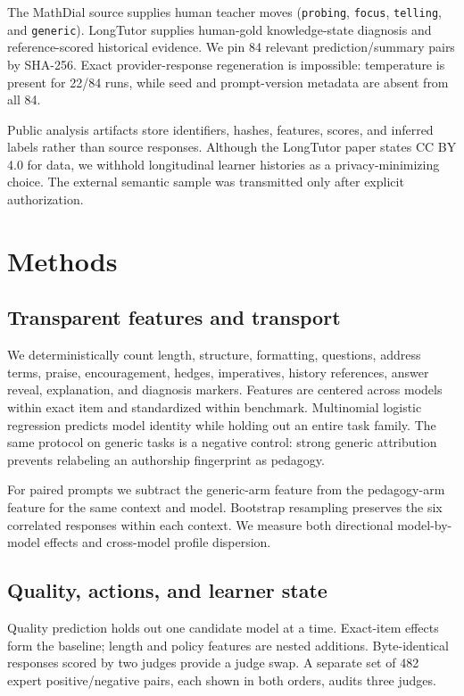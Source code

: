 \documentclass[11pt]{article}
\begin{document}
The MathDial source supplies human teacher moves (\texttt{probing},
\texttt{focus}, \texttt{telling}, and \texttt{generic}). LongTutor supplies
human-gold knowledge-state diagnosis and reference-scored historical evidence.
We pin 84 relevant prediction/summary pairs by SHA-256. Exact provider-response
regeneration is impossible: temperature is present for 22/84 runs, while seed
and prompt-version metadata are absent from all 84.

Public analysis artifacts store identifiers, hashes, features, scores, and
inferred labels rather than source responses. Although the LongTutor paper
states CC BY 4.0 for data, we withhold longitudinal learner histories as a
privacy-minimizing choice. The external semantic sample was transmitted only
after explicit authorization.

\section{Methods}

\subsection{Transparent features and transport}

We deterministically count length, structure, formatting, questions, address
terms, praise, encouragement, hedges, imperatives, history references, answer
reveal, explanation, and diagnosis markers. Features are centered across models
within exact item and standardized within benchmark. Multinomial logistic
regression predicts model identity while holding out an entire task family. The
same protocol on generic tasks is a negative control: strong generic attribution
prevents relabeling an authorship fingerprint as pedagogy.

For paired prompts we subtract the generic-arm feature from the pedagogy-arm
feature for the same context and model. Bootstrap resampling preserves the six
correlated responses within each context. We measure both directional
model-by-model effects and cross-model profile dispersion.

\subsection{Quality, actions, and learner state}

Quality prediction holds out one candidate model at a time. Exact-item effects
form the baseline; length and policy features are nested additions. Byte-identical
responses scored by two judges provide a judge swap. A separate set of 482 expert
positive/negative pairs, each shown in both orders, audits three judges.
\end{document}
